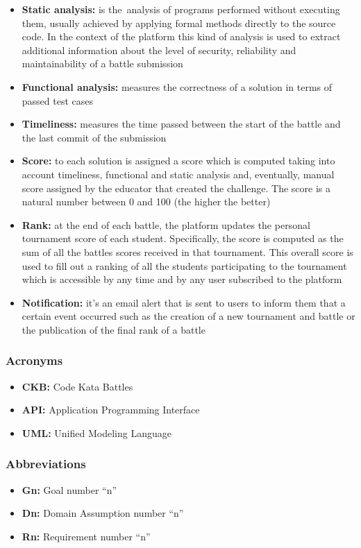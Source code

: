 \begin{itemize}
    \item {\textbf{Static analysis:} is the analysis of programs performed without executing them, usually achieved by applying formal methods directly to the source code. In the context of the platform this kind of analysis is used to extract additional information about the level of security, reliability and maintainability of a battle submission}
    \item {\textbf{Functional analysis:} measures the correctness of a solution in terms of passed test cases}
    \item {\textbf{Timeliness:} measures the time passed between the start of the battle and the last commit of the submission}
    \item {\textbf{Score:} to each solution is assigned a score which is computed taking into account timeliness, functional and static analysis and, eventually, manual score assigned by the educator that created the challenge. The score is a natural number between 0 and 100 (the higher the better)}
    \item {\textbf{Rank:} at the end of each battle, the platform updates the personal tournament score of each student. Specifically, the score is computed as the sum of all the battles scores received in that tournament. This overall score is used to fill out a ranking of all the students participating to the tournament which is accessible by any time and by any user subscribed to the platform}
    \item {\textbf{Notification:} it's an  email alert that is sent to users to inform them that a certain event occurred such as the creation of a new tournament and battle or the publication of the final rank of a battle}

\end{itemize}
\subsubsection{Acronyms}
\begin{itemize}
    \item {\textbf{CKB:} Code Kata Battles}
    \item {\textbf{API:} Application Programming Interface}
    \item {\textbf{UML:} Unified Modeling Language}
\end{itemize}
\subsubsection{Abbreviations}
\begin{itemize}
    \item {\textbf{Gn:} Goal number “n”}
    \item {\textbf{Dn:} Domain Assumption number “n”}
    \item {\textbf{Rn:} Requirement number “n”}
\end{itemize}
